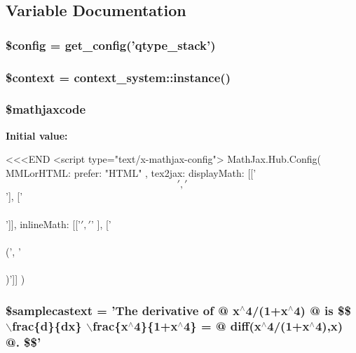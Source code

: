\subsection{Variable Documentation}
\hypertarget{healthcheck_8php_a49c7011be9c979d9174c52a8b83e5d8e}{
\subsubsection[{\$config}]{\setlength{\rightskip}{0pt plus 5cm}\$config = get\_\-config('{\bf qtype\_\-stack}')}}
\label{healthcheck_8php_a49c7011be9c979d9174c52a8b83e5d8e}
\hypertarget{healthcheck_8php_ae05dedb802ada0155efdece2044fed64}{
\subsubsection[{\$context}]{\setlength{\rightskip}{0pt plus 5cm}\$context = context\_\-system::instance()}}
\label{healthcheck_8php_ae05dedb802ada0155efdece2044fed64}
\hypertarget{healthcheck_8php_a8c8e2564bf536b8e2c30911f70fb7a3e}{
\subsubsection[{\$mathjaxcode}]{\setlength{\rightskip}{0pt plus 5cm}\$mathjaxcode}}
\label{healthcheck_8php_a8c8e2564bf536b8e2c30911f70fb7a3e}
{\bfseries Initial value:}
\begin{DoxyCode}
 <<<END
<script type="text/x-mathjax-config">
MathJax.Hub.Config({
    MMLorHTML: { prefer: "HTML" },
    tex2jax: {
        displayMath: [['$$', '$$'], ['\\\\[', '\\\\]']],
        inlineMath:  [['$',  '$' ], ['\\\\(', '\\\\)']]
    }
})
\end{DoxyCode}
\hypertarget{healthcheck_8php_ad8590b7afabc52a690a1e8e5859f3155}{
\subsubsection[{\$samplecastext}]{\setlength{\rightskip}{0pt plus 5cm}\$samplecastext = 'The derivative of @ x$^\wedge$4/(1+x$^\wedge$4) @ is \$\$ $\backslash$frac\{d\}\{dx\} $\backslash$frac\{x$^\wedge$4\}\{1+x$^\wedge$4\} = @ diff(x$^\wedge$4/(1+x$^\wedge$4),x) @. \$\$'}}

